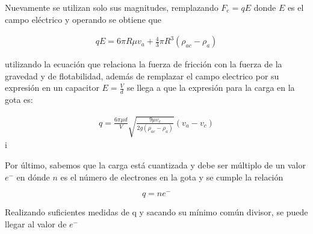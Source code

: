 Nuevamente se utilizan solo sus magnitudes, remplazando $F_e=qE$ donde $E$ es el campo eléctrico y operando se obtiene que

\begin{equation}
    \begin{split}
        qE=6\pi R\mu v_a + \frac{4}{3}\pi R^3(\rho_{ac}-\rho_a)
    \end{split}
\end{equation}

utilizando la ecuación que relaciona la fuerza de fricción con la fuerza de la gravedad y de flotabilidad, además de remplazar el campo electrico por su expresión en un capacitor $E=\frac{V}{d}$ se llega a que la expresión para la carga en la gota es:

\begin{equation}
    \begin{split}
        q=\frac{6\pi \mu d}{V}\sqrt{\frac{9\mu v_c}{2g(\rho_{ac}-\rho_a)}}(v_a-v_c)
    \end{split}
\end{equation}i

Por último, sabemos que la carga está cuantizada y debe ser múltiplo de un valor $e^-$ en dónde $n$ es el número de electrones en la gota y se cumple la relación

\begin{equation}
    q=ne^-
\end{equation}

Realizando suficientes medidas de q y sacando su mínimo común divisor, se puede llegar al valor de $e^-$

